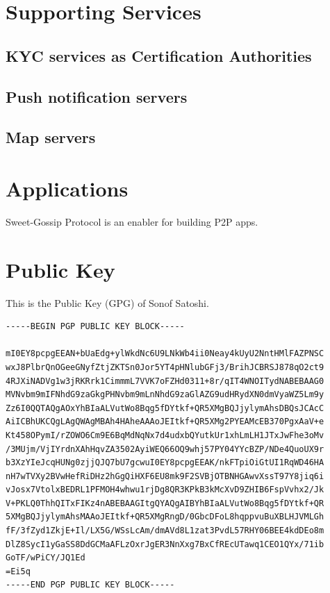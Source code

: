 \documentclass{article}
\begin{document}
\section{Supporting Services}

\subsection{KYC services as Certification Authorities}

\subsection{Push notification servers}

\subsection{Map servers}

\section{Applications}

Sweet-Gossip Protocol is an enabler for building P2P apps.


\section{Public Key}
This is the Public Key (GPG) of Sonof Satoshi.
\label{gpgkey}
\begin{small}
\begin{verbatim}
-----BEGIN PGP PUBLIC KEY BLOCK-----

mI0EY8pcpgEEAN+bUaEdg+ylWkdNc6U9LNkWb4ii0Neay4kUyU2NntHMlFAZPNSC
wxJ8PlbrQnOGeeGNyfZtjZKTSn0Jor5YT4pHNlubGFj3/BrihJCBRSJ878qO2ct9
4RJXiNADVg1w3jRKRrk1CimmmL7VVK7oFZHd0311+8r/qIT4WNOITydNABEBAAG0
MVNvbm9mIFNhdG9zaGkgPHNvbm9mLnNhdG9zaGlAZG9udHRydXN0dmVyaWZ5Lm9y
Zz6I0QQTAQgAOxYhBIaALVutWo8Bqg5fDYtkf+QR5XMgBQJjylymAhsDBQsJCAcC
AiICBhUKCQgLAgQWAgMBAh4HAheAAAoJEItkf+QR5XMg2PYEAMcEB370PgxAaV+e
Kt458OPymI/rZOWO6Cm9E6BqMdNqNx7d4udxbQYutkUr1xhLmLH1JTxJwFhe3oMv
/3MUjm/VjIYrdnXAhHqvZA3502AyiWEQ66OQ9whj57PY04YYcBZP/NDe4QuoUX9r
b3XzYIeJcqHUNg0zjjQJQ7bU7gcwuI0EY8pcpgEEAK/nkFTpiOiGtUI1RqWD46HA
nH7wTVXy2BVwHefRiDHz2hGgQiHXF6EU8mk9F2SVBjOTBNHGAwvXssT97Y8jiq6i
vJosx7VtolxBEDRL1PFMOH4whwu1rjDg8QR3KPkB3kMcXvD9ZHIB6FspVvhx2/Jk
V+PKLQ0ThhQITxFIKz4nABEBAAGItgQYAQgAIBYhBIaALVutWo8Bqg5fDYtkf+QR
5XMgBQJjylymAhsMAAoJEItkf+QR5XMgRngD/0GbcDFoL8hqppvuBuXBLHJVMLGh
fF/3fZyd1ZkjE+Il/LX5G/WSsLcAm/dmAVd8L1zat3PvdL57RHY06BEE4kdDEo8m
DlZ8SycI1yGaSS8DdGCMaAFLzOxrJgER3NnXxg7BxCfREcUTawq1CEO1QYx/71ib
GoTF/wPiCY/JQ1Ed
=Ei5q
-----END PGP PUBLIC KEY BLOCK-----
\end{verbatim}
\end{small}



  
\end{document}
